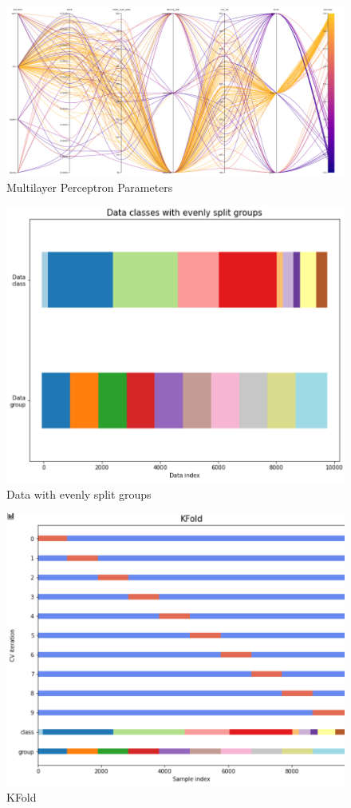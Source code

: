 \documentclass[11pt]{article}
\begin{document}
\begin{figure}[h]
  \caption {Multilayer Perceptron Parameters} \label{ParallelCoordMLP}
  \centering 
  \includegraphics[width = \textwidth, height = \textwidth, keepaspectratio]{Images/MLP ParallelCoordGraph.png}
\end{figure}
\FloatBarrier

\begin{figure}[h]
  \caption {Data with evenly split groups} \label{DataWWithEvenlySplitGroups}
  \centering 
  \includegraphics[width = \textwidth, height = 0.5\textwidth, keepaspectratio]{Images/DataWithEvenlySplitGroups.png}
\end{figure}


\begin{figure}[h]
  \caption {KFold} \label{KFoldVisualised}
  \centering 
  \includegraphics[width = \textwidth, height = 0.5\textwidth, keepaspectratio]{Images/KFold.png}
\end{figure}


\FloatBarrier
\end{document}
